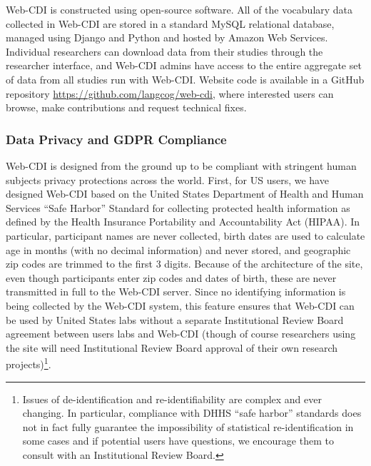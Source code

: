 \documentclass[
  english,
  man]{apa7}
\begin{document}
Web-CDI is constructed using open-source software. All of the vocabulary data collected in Web-CDI are stored in a standard MySQL relational database, managed using Django and Python and hosted by Amazon Web Services. Individual researchers can download data from their studies through the researcher interface, and Web-CDI admins have access to the entire aggregate set of data from all studies run with Web-CDI. Website code is available in a GitHub repository \url{https://github.com/langcog/web-cdi}, where interested users can browse, make contributions and request technical fixes.

\hypertarget{data-privacy-and-gdpr-compliance}{%
\subsubsection{Data Privacy and GDPR Compliance}\label{data-privacy-and-gdpr-compliance}}

Web-CDI is designed from the ground up to be compliant with stringent human subjects privacy protections across the world. First, for US users, we have designed Web-CDI based on the United States Department of Health and Human Services \enquote{Safe Harbor} Standard for collecting protected health information as defined by the Health Insurance Portability and Accountability Act (HIPAA). In particular, participant names are never collected, birth dates are used to calculate age in months (with no decimal information) and never stored, and geographic zip codes are trimmed to the first 3 digits. Because of the architecture of the site, even though participants enter zip codes and dates of birth, these are never transmitted in full to the Web-CDI server. Since no identifying information is being collected by the Web-CDI system, this feature ensures that Web-CDI can be used by United States labs without a separate Institutional Review Board agreement between users labs and Web-CDI (though of course researchers using the site will need Institutional Review Board approval of their own research projects)\footnote{Issues of de-identification and re-identifiability are complex and ever changing. In particular, compliance with DHHS \enquote{safe harbor} standards does not in fact fully guarantee the impossibility of statistical re-identification in some cases and if potential users have questions, we encourage them to consult with an Institutional Review Board.}.
\end{document}
